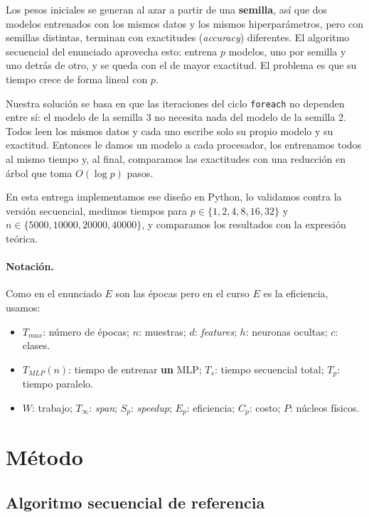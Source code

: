 \documentclass[11pt,a4paper]{article}
\begin{document}
Los pesos iniciales se generan al azar a partir de una \textbf{semilla}, así que dos modelos entrenados con los mismos datos y los mismos hiperparámetros, pero con semillas distintas, terminan con exactitudes (\emph{accuracy}) diferentes. El algoritmo secuencial del enunciado aprovecha esto: entrena $p$ modelos, uno por semilla y uno detrás de otro, y se queda con el de mayor exactitud. El problema es que su tiempo crece de forma lineal con $p$.

Nuestra solución se basa en que las iteraciones del ciclo \texttt{foreach} no dependen entre sí: el modelo de la semilla 3 no necesita nada del modelo de la semilla 2. Todos leen los mismos datos y cada uno escribe solo su propio modelo y su exactitud. Entonces le damos un modelo a cada procesador, los entrenamos todos al mismo tiempo y, al final, comparamos las exactitudes con una reducción en árbol que toma $O(\log p)$ pasos.

En esta entrega implementamos ese diseño en Python, lo validamos contra la versión secuencial, medimos tiempos para $p\in\{1,2,4,8,16,32\}$ y $n\in\{5000,10000,20000,40000\}$, y comparamos los resultados con la expresión teórica.

\paragraph{Notación.} Como en el enunciado $E$ son las épocas pero en el curso $E$ es la eficiencia, usamos:
\begin{itemize}[leftmargin=1.2cm]
\item $T_{max}$: número de épocas; $n$: muestras; $d$: \emph{features}; $h$: neuronas ocultas; $c$: clases.
\item $T_{MLP}(n)$: tiempo de entrenar \textbf{un} MLP; $T_s$: tiempo secuencial total; $T_p$: tiempo paralelo.
\item $W$: trabajo; $T_\infty$: \emph{span}; $S_p$: \emph{speedup}; $E_p$: eficiencia; $C_p$: costo; $P$: núcleos físicos.
\end{itemize}

\section{Método}

\subsection{Algoritmo secuencial de referencia}
\end{document}
